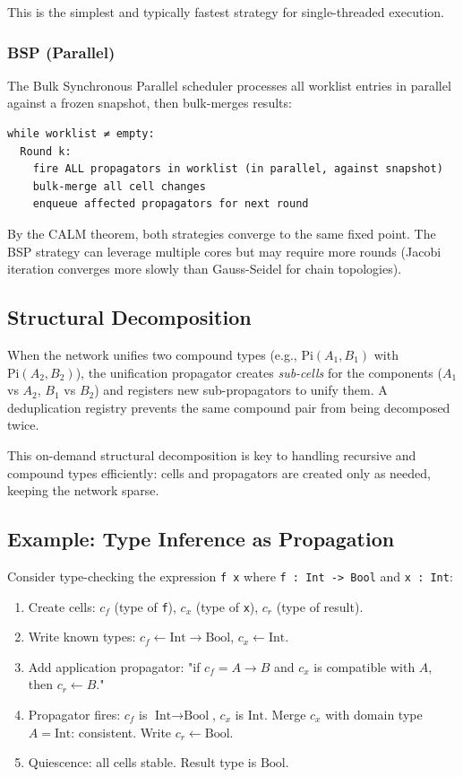 \documentclass[11pt]{article}
\begin{document}
This is the simplest and typically fastest strategy for single-threaded
execution.
\subsubsection{BSP (Parallel)}
\label{sec:org0876f56}

The Bulk Synchronous Parallel scheduler processes all worklist entries in
parallel against a frozen snapshot, then bulk-merges results:

\begin{verbatim}
while worklist ≠ empty:
  Round k:
    fire ALL propagators in worklist (in parallel, against snapshot)
    bulk-merge all cell changes
    enqueue affected propagators for next round
\end{verbatim}

By the CALM theorem, both strategies converge to the same fixed point.
The BSP strategy can leverage multiple cores but may require more rounds
(Jacobi iteration converges more slowly than Gauss-Seidel for chain
topologies).
\subsection{Structural Decomposition}
\label{sec:org0d88e7b}

When the network unifies two compound types (e.g., \(\text{Pi}(A_1,
B_1)\) with \(\text{Pi}(A_2, B_2)\)), the unification propagator creates
\emph{sub-cells} for the components (\(A_1\) vs \(A_2\), \(B_1\) vs \(B_2\)) and
registers new sub-propagators to unify them. A deduplication registry
prevents the same compound pair from being decomposed twice.

This on-demand structural decomposition is key to handling recursive and
compound types efficiently: cells and propagators are created only as
needed, keeping the network sparse.
\subsection{Example: Type Inference as Propagation}
\label{sec:org1dea322}

Consider type-checking the expression \texttt{f x} where \texttt{f : Int -> Bool} and
\texttt{x : Int}:

\begin{enumerate}
\item Create cells: \(c_f\) (type of \texttt{f}), \(c_x\) (type of \texttt{x}), \(c_r\)
(type of result).
\item Write known types: \(c_f \leftarrow \text{Int} \to \text{Bool}\), \(c_x
   \leftarrow \text{Int}\).
\item Add application propagator: "if \(c_f = A \to B\) and \(c_x\) is
compatible with \(A\), then \(c_r \leftarrow B\)."
\item Propagator fires: \(c_f\) is \(\text{Int} \to \text{Bool}\), \(c_x\) is
\(\text{Int}\). Merge \(c_x\) with domain type \(A = \text{Int}\):
consistent. Write \(c_r \leftarrow \text{Bool}\).
\item Quiescence: all cells stable. Result type is \(\text{Bool}\).
\end{enumerate}
\end{document}
